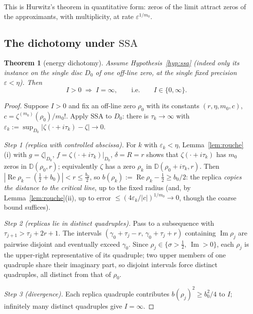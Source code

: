 \documentclass[11pt]{amsart}
\theoremstyle{plain}
\newtheorem{theorem}{Theorem}[section]
\theoremstyle{definition}
\theoremstyle{remark}
\renewcommand{\Re}{\operatorname{Re}}
\newcommand{\Imm}{\operatorname{Im}}
\begin{document}
This is Hurwitz's theorem in quantitative form: zeros of the limit attract zeros of the approximants, with multiplicity, at rate $\varepsilon^{1/m_0}$.

\subsection{The dichotomy under $\mathrm{SSA}$}

\begin{theorem}[energy dichotomy]\label{thm:dichotomy}
Assume Hypothesis~\ref{hyp:ssa} \textup{(}indeed only its instance on the single disc $D_0$ of one off-line zero, at the single fixed precision $\varepsilon<\eta$\textup{)}. Then
\[
I>0\;\Longrightarrow\;I=\infty,
\qquad\text{i.e.}\qquad I\in\{0,\infty\}.
\]
\end{theorem}

\begin{proof}
Suppose $I>0$ and fix an off-line zero $\rho_0$ with its constants $(r,\eta,m_0,c)$, $c=\zeta^{(m_0)}(\rho_0)/m_0!$. Apply $\mathrm{SSA}$ to $D_0$: there is $\tau_k\to\infty$ with $\varepsilon_k:=\sup_{D_0}|\zeta(\cdot+i\tau_k)-\zeta|\to0$.

\emph{Step 1 (replica with controlled abscissa).} For $k$ with $\varepsilon_k<\eta$, Lemma~\ref{lem:rouche}(i) with $g=\zeta|_{D_0}$, $f=\zeta(\cdot+i\tau_k)|_{D_0}$, $\delta=R=r$ shows that $\zeta(\cdot+i\tau_k)$ has $m_0$ zeros in $\mathbb D(\rho_0,r)$; equivalently $\zeta$ has a zero $\rho_k$ in $\mathbb D(\rho_0+i\tau_k,r)$. Then $|\Re\rho_k-(\tfrac12+b_0)|<r\le\tfrac{b_0}2$, so $b(\rho_k):=\Re\rho_k-\tfrac12\ge b_0/2$: the replica \emph{copies the distance to the critical line}, up to the fixed radius (and, by Lemma~\ref{lem:rouche}(ii), up to error $\le(4\varepsilon_k/|c|)^{1/m_0}\to0$, though the coarse bound suffices).

\emph{Step 2 (replicas lie in distinct quadruples).} Pass to a subsequence with $\tau_{j+1}>\tau_j+2r+1$. The intervals $(\gamma_0+\tau_j-r,\,\gamma_0+\tau_j+r)$ containing $\Imm\rho_j$ are pairwise disjoint and eventually exceed $\gamma_0$. Since $\rho_j\in\{\sigma>\tfrac12,\ \Imm>0\}$, each $\rho_j$ is the upper-right representative of its quadruple; two upper members of one quadruple share their imaginary part, so disjoint intervals force distinct quadruples, all distinct from that of $\rho_0$.

\emph{Step 3 (divergence).} Each replica quadruple contributes $b(\rho_j)^2\ge b_0^2/4$ to $I$; infinitely many distinct quadruples give $I=\infty$.
\end{proof}
\end{document}
